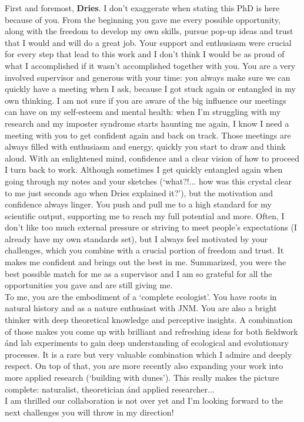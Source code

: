 \documentclass[10pt, twoside]{book} %
\begin{document}
\begin{small}
First and foremost, \textbf{Dries}. I don't exaggerate when stating this PhD is here because of you. From the beginning you gave me every possible opportunity, along with the freedom to develop my own skills, pursue pop-up ideas and trust that I would and will do a great job. Your support and enthusiasm were crucial for every step that lead to this work and I don't think I would be as proud of what I accomplished if it wasn't accomplished together with you. You are a very involved supervisor and generous with your time: you always make sure we can quickly have a meeting when I ask, because I got stuck again or entangled in my own thinking. I am not sure if you are aware of the big influence our meetings can have on my self-esteem and mental health: when I'm struggling with my research and my imposter syndrome starts haunting me again, I know I need a meeting with you to get confident again and back on track. Those meetings are always filled with enthusiasm and energy, quickly you start to draw and think aloud. With an enlightened mind, confidence and a clear vision of how to proceed I turn back to work. Although sometimes I get quickly entangled again when going through my notes and your sketches (`what?!... how was this crystal clear to me just seconds ago when Dries explained it?'), but the motivation and confidence always linger. You push and pull me to a high standard for my scientific output, supporting me to reach my full potential and more. Often, I don't like too much external pressure or striving to meet people's expectations (I already have my own standards set), but I always feel motivated by your challenges, which you combine with a crucial portion of freedom and trust. It makes me confident and brings out the best in me. Summarized, you were the best possible match for me as a supervisor and I am so grateful for all the opportunities you gave and are still giving me.\\
To me, you are the embodiment of a `complete ecologist'. You have roots in natural history and as a nature enthusiast with JNM. You are also a bright thinker with deep theoretical knowledge and perceptive insights. A combination of those makes you come up with brilliant and refreshing ideas for both fieldwork \'{a}nd lab experiments to gain deep understanding of ecological and evolutionary processes. It is a rare but very valuable combination which I admire and deeply respect. On top of that, you are more recently also expanding your work into more applied research (`building with dunes'). This really makes the picture complete: naturalist, theoretician \'{a}nd applied researcher...\\
I am thrilled our collaboration is not over yet and I'm looking forward to the next challenges you will throw in my direction!\\


\end{small}
\end{document}

